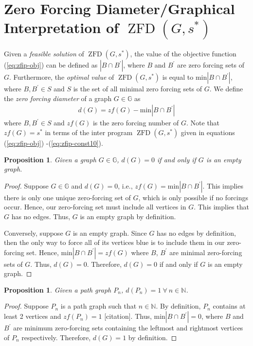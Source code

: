 \documentclass{article}
\newcommand\zfd[1]{\operatorname{ZFD}\left(#1\right)}
\newtheorem{proposition}[theorem]{Proposition}
\theoremstyle{definition}
\begin{document}
\section{Zero Forcing Diameter/Graphical Interpretation of $\zfd{G,s^{*}}$}\label{sec:zfdiam}
 Given a \textit{feasible solution} of $\zfd{G,s^{*}}$, the value of the objective function (\ref{eq:zfip-obj}) can be defined as $|B \cap B^{'}|$, where $B$ and $B^{'}$ are zero forcing sets of $G$.
Furthermore, the \textit{optimal value} of $\zfd{G,s^{*}}$ is equal to $\text{min}|B \cap B^{'}|$, where $B,B^{'} \in S$ and $S$ is the set of all minimal zero forcing sets of $G$.
We define the \textit{zero forcing diameter} of a graph $G \in \mathbb{G}$ as 
\begin{align}
d(G) = zf(G) - \text{min}|B \cap B^{'}|
\end{align}
 where $B,B^{'} \in S$ and $zf(G)$ is the zero forcing number of $G$.
Note that $zf(G) = s^{*}$ in terms of the inter program $\zfd{G,s^{*}}$ given in equations (\ref{eq:zfip-obj}) -(\ref{eq:zfip-const10}).

\begin{proposition}
Given a graph $G \in \mathbb{G}$, $d(G) = 0$ if and only if $G$ is an empty graph.
\end{proposition}
\begin{proof}
Suppose $G \in \mathbb{G}$ and $d(G) = 0$, i.e., $zf(G) = \text{min}|B \cap B^{'}|$.
This implies there is only one unique zero-forcing set of $G$, which is only possible if no forcings occur.
Hence, our zero-forcing set must include all vertices in $G$.
This implies that $G$ has no edges.
Thus, $G$ is an empty graph by definition.

Conversely, suppose $G$ is an empty graph.
Since $G$ has no edges by definition, then the only way to force all of its vertices blue is to include them in our zero-forcing set.
Hence, $\text{min}|B \cap B^{'}| = zf(G)$ where $B$, $B^{'}$ are minimal zero-forcing sets of $G$.
Thus, $d(G) = 0$.
Therefore, $d(G) = 0$ if and only if $G$ is an empty graph.
\end{proof}

\begin{proposition}
Given a path graph $P_n$, $d(P_n)=1 \ \forall \ n \in \mathbb{N}$.
\end{proposition}
\begin{proof}
Suppose $P_n$ is a path graph such that $n  \in \mathbb{N}$.
By definition, $P_n$ contains at least 2 vertices and $zf(P_n) = 1$ [citation].
Thus, $\text{min}|B\cap B^{'}| = 0$, where $B$ and $B^{'}$ are minimum zero-forcing sets containing the leftmost and rightmost vertices of $P_n$ respectively. 
Therefore, $d(G) = 1$ by definition.
\end{proof}
\end{document}
